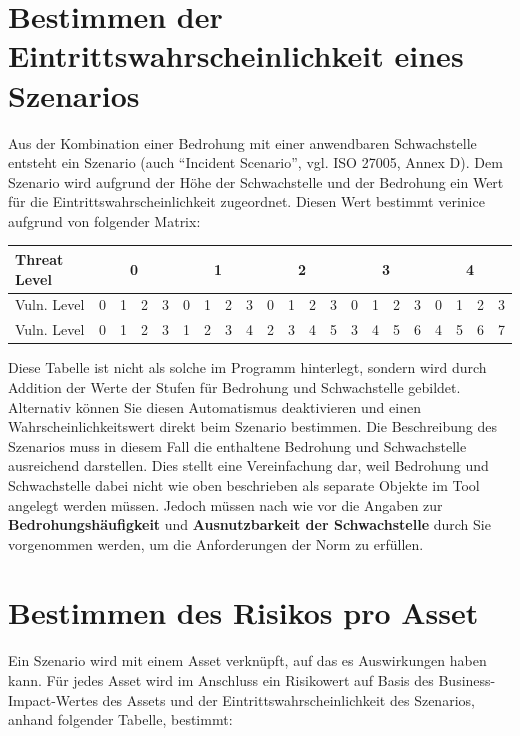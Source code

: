 \documentclass[a4paper,10pt]{book}
\begin{document}
\section{Bestimmen der Eintrittswahrscheinlichkeit eines Szenarios}
Aus der Kombination einer Bedrohung mit einer anwendbaren Schwachstelle
entsteht ein Szenario (auch ``Incident Scenario'', vgl. ISO 27005, Annex D). Dem
Szenario wird aufgrund der Höhe der Schwachstelle und der Bedrohung ein Wert
für die Eintrittswahrscheinlichkeit zugeordnet. Diesen Wert bestimmt verinice
aufgrund von folgender Matrix:
\begin{longtable}{|l||c|c|c|c|c|c|c|c|c|c|c|c|c|c|c|c|c|c|c|c|}
\hline
Threat Level & \multicolumn{4}{c|}{0} & \multicolumn{4}{c|}{1} & \multicolumn{4}{c|}{2} & \multicolumn{4}{c|}{3} & \multicolumn{4}{c|}{4} \\[10pt]
\hline
Vuln. Level & 0 & 1 & 2 & 3 & 0 & 1 & 2 & 3 & 0 & 1 & 2 & 3 & 0 & 1 & 2 & 3 & 0 & 1 & 2 & 3  \\[9pt] \hline
Vuln. Level & 0 & 1 & 2 & 3 & 1 & 2 & 3 & 4 & 2 & 3 & 4 & 5 & 3 & 4 & 5 & 6 & 4 & 5 & 6 & 7  \\[9pt] \hline
\end{longtable}

Diese Tabelle ist nicht als solche im Programm hinterlegt, sondern wird durch
Addition der Werte der Stufen für Bedrohung und Schwachstelle gebildet.
\newline\\
Alternativ können Sie diesen Automatismus deaktivieren und einen
Wahrscheinlichkeitswert direkt beim Szenario bestimmen. Die Beschreibung des
Szenarios muss in diesem Fall die enthaltene Bedrohung und Schwachstelle
ausreichend darstellen. Dies stellt eine Vereinfachung dar, weil Bedrohung und
Schwachstelle dabei nicht wie oben beschrieben als separate Objekte im Tool
angelegt werden müssen. Jedoch müssen nach wie vor die Angaben zur \textbf{Bedrohungshäufigkeit} und \textbf{Ausnutzbarkeit der Schwachstelle} durch Sie vorgenommen werden, um die
Anforderungen der Norm zu erfüllen.

\section{Bestimmen des Risikos pro Asset}
Ein Szenario wird mit einem Asset verknüpft, auf das es Auswirkungen haben kann.
Für jedes Asset wird im Anschluss ein Risikowert auf Basis des Business-Impact-Wertes des Assets
und der Eintrittswahrscheinlichkeit des Szenarios, anhand folgender
Tabelle, bestimmt:
\end{document}
